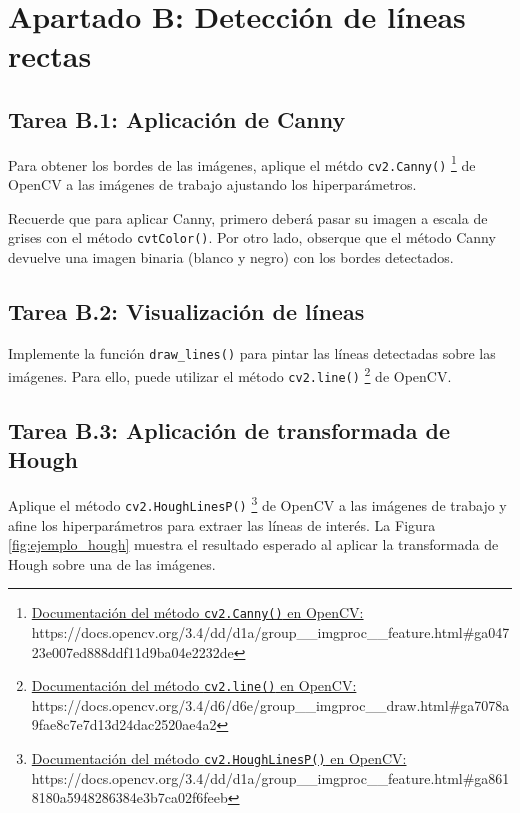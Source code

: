 \chapter{Apartado B: \textbf{Detección de líneas rectas}}
\label{chapter:tarea_b}

\section*{Tarea B.1: Aplicación de Canny}
{}

Para obtener los bordes de las imágenes, aplique el métdo \texttt{cv2.Canny()} \footnote{ \href{https://docs.opencv.org/3.4/dd/d1a/group\_\_imgproc\_\_feature.html\#ga04723e007ed888ddf11d9ba04e2232de}{Documentación del método \texttt{cv2.Canny()} en OpenCV:} \\{https://docs.opencv.org/3.4/dd/d1a/group\_\_imgproc\_\_feature.html\#ga04723e007ed888ddf11d9ba04e2232de}} de OpenCV a las imágenes de trabajo ajustando los hiperparámetros.

Recuerde que para aplicar Canny, primero deberá pasar su imagen a escala de grises con el método \texttt{cvtColor()}. Por otro lado, obserque que el método Canny devuelve una imagen binaria (blanco y negro) con los bordes detectados.


\section*{Tarea B.2: Visualización de líneas}
{}

Implemente la función \texttt{draw\_lines()} para pintar las líneas detectadas sobre las imágenes. Para ello, puede utilizar el método \texttt{cv2.line()} \footnote{ \href{https://docs.opencv.org/3.4/d6/d6e/group\_\_imgproc\_\_draw.html\#ga7078a9fae8c7e7d13d24dac2520ae4a2}{Documentación del método \texttt{cv2.line()} en OpenCV:} \\{https://docs.opencv.org/3.4/d6/d6e/group\_\_imgproc\_\_draw.html\#ga7078a9fae8c7e7d13d24dac2520ae4a2}} de OpenCV.


\section*{Tarea B.3: Aplicación de transformada de Hough}
{} 
Aplique el método \texttt{cv2.HoughLinesP()} \footnote{ \href{https://docs.opencv.org/3.4/dd/d1a/group\_\_imgproc\_\_feature.html\#ga8618180a5948286384e3b7ca02f6feeb}{Documentación del método \texttt{cv2.HoughLinesP()} en OpenCV:} \\{https://docs.opencv.org/3.4/dd/d1a/group\_\_imgproc\_\_feature.html\#ga8618180a5948286384e3b7ca02f6feeb}} de OpenCV a las imágenes de trabajo y afine los hiperparámetros para extraer las líneas de interés. La Figura \ref{fig:ejemplo_hough} muestra el resultado esperado al aplicar la transformada de Hough sobre una de las imágenes.

